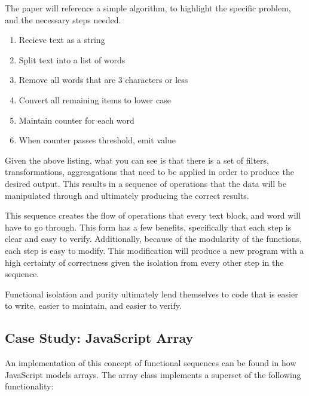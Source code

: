 \documentclass{article}
\begin{document}
  The paper will reference a simple algorithm, to highlight the specific problem, and the necessary steps needed.

  \begin{enumerate}
    \item Recieve text as a string
    \item Split text into a list of words
    \item Remove all words that are 3 characters or less
    \item Convert all remaining items to lower case
    \item Maintain counter for each word 
    \item When counter passes threshold, emit value
  \end{enumerate}

  Given the above listing, what you can see is that there is a set of filters, transformations, aggreagations that need to be applied in order to produce the desired output.  This results in a sequence of operations that the data will be manipulated through and ultimately producing the correct results.  

  This sequence creates the flow of operations that every text block, and word will have to go through.  This form has a few benefits, specifically that each step is clear and easy to verify.  Additionally, because of the modularity of the functions, each step is easy to modify.  This modification will produce a new program with a high certainty of correctness given the isolation from every other step in the sequence.  

  Functional isolation and purity ultimately lend themselves to code that is easier to write, easier to maintain, and easier to verify.  

\subsection{Case Study: JavaScript Array}

  An implementation of this concept of functional sequences can be found in how JavaScript models arrays.  The array class implements a superset of the following functionality:
\end{document}
